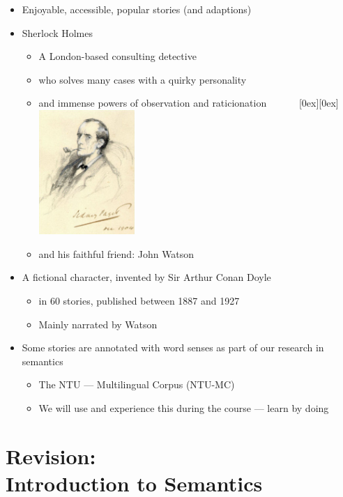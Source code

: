 \documentclass[a4paper,landscape,headrule,footrule,xetex]{foils}
\begin{document}
\begin{itemize}
\item Enjoyable, accessible, popular  stories (and adaptions)
\item Sherlock Holmes 
  \begin{itemize}
  \item A London-based consulting detective
    
  \item who solves many cases with a quirky personality
  \item and immense powers of observation and raticionation
    \ \ \ \ \ \ \raisebox{-15ex}[0ex][0ex]{\includegraphics[width=0.3\textwidth]{pics/Sherlock_Holmes_Portrait_Paget}}
  \item and his faithful friend: John Watson
\end{itemize}
\item A fictional character, invented by Sir Arthur Conan Doyle
  \begin{itemize}
  \item in 60 stories,  published between 1887 and 1927
  \item Mainly narrated by Watson
  \end{itemize}
\item Some stories are annotated with word senses as part of our
  research in semantics
  \begin{itemize}
  \item The NTU --- Multilingual Corpus (NTU-MC)
  \item We will use and experience this during the course --- learn by doing
  \end{itemize}
\end{itemize}


\section{Revision: \\ Introduction to Semantics}
\end{document}
